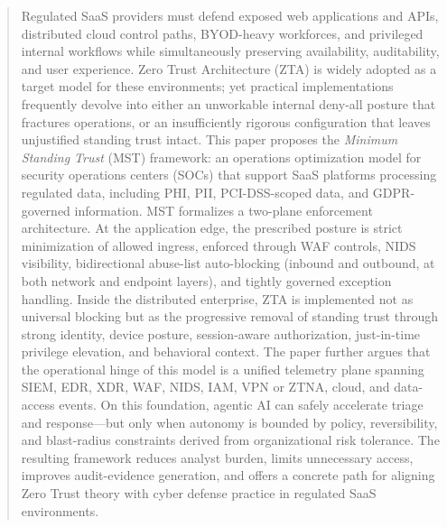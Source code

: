 \documentclass[acmlarge]{acmart}
\begin{document}
\begin{abstract}
Regulated SaaS providers must defend exposed web applications and APIs, distributed cloud control paths, BYOD-heavy workforces, and privileged internal workflows while simultaneously preserving availability, auditability, and user experience. Zero Trust Architecture (ZTA) is widely adopted as a target model for these environments; yet practical implementations frequently devolve into either an unworkable internal deny-all posture that fractures operations, or an insufficiently rigorous configuration that leaves unjustified standing trust intact. This paper proposes the \textit{Minimum Standing Trust} (MST) framework: an operations optimization model for security operations centers (SOCs) that support SaaS platforms processing regulated data, including PHI, PII, PCI-DSS-scoped data, and GDPR-governed information. MST formalizes a two-plane enforcement architecture. At the application edge, the prescribed posture is strict minimization of allowed ingress, enforced through WAF controls, NIDS visibility, bidirectional abuse-list auto-blocking (inbound and outbound, at both network and endpoint layers), and tightly governed exception handling. Inside the distributed enterprise, ZTA is implemented not as universal blocking but as the progressive removal of standing trust through strong identity, device posture, session-aware authorization, just-in-time privilege elevation, and behavioral context. The paper further argues that the operational hinge of this model is a unified telemetry plane spanning SIEM, EDR, XDR, WAF, NIDS, IAM, VPN or ZTNA, cloud, and data-access events. On this foundation, agentic AI can safely accelerate triage and response---but only when autonomy is bounded by policy, reversibility, and blast-radius constraints derived from organizational risk tolerance. The resulting framework reduces analyst burden, limits unnecessary access, improves audit-evidence generation, and offers a concrete path for aligning Zero Trust theory with cyber defense practice in regulated SaaS environments.
\end{abstract}
\end{document}

